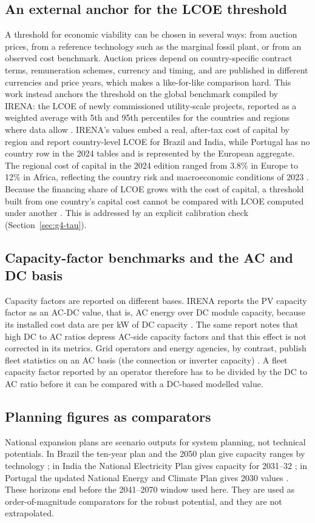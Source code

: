 \subsection{An external anchor for the LCOE threshold}
A threshold for economic viability can be chosen in several ways: from auction prices, from a reference technology such as the marginal fossil plant, or from an observed cost benchmark. Auction prices depend on country-specific contract terms, remuneration schemes, currency and timing, and are published in different currencies and price years, which makes a like-for-like comparison hard. This work instead anchors the threshold on the global benchmark compiled by IRENA: the LCOE of newly commissioned utility-scale projects, reported as a weighted average with 5th and 95th percentiles for the countries and regions where data allow \citep{irena2025costs24,irena2026costs25es}. IRENA's values embed a real, after-tax cost of capital by region and report country-level LCOE for Brazil and India, while Portugal has no country row in the 2024 tables and is represented by the European aggregate. The regional cost of capital in the 2024 edition ranged from 3.8\% in Europe to 12\% in Africa, reflecting the country risk and macroeconomic conditions of 2023 \citep{irena2025costs24}. Because the financing share of LCOE grows with the cost of capital, a threshold built from one country's capital cost cannot be compared with LCOE computed under another \citep{irena2025costs24}. This is addressed by an explicit calibration check (Section~\ref{sec:g4-tau}).

\subsection{Capacity-factor benchmarks and the AC and DC basis}
Capacity factors are reported on different bases. IRENA reports the PV capacity factor as an AC-DC value, that is, AC energy over DC module capacity, because its installed cost data are per kW of DC capacity \citep{irena2025costs24}. The same report notes that high DC to AC ratios depress AC-side capacity factors and that this effect is not corrected in its metrics. Grid operators and energy agencies, by contrast, publish fleet statistics on an AC basis (the connection or inverter capacity) \citep{epe2024nt011,ren2025dados,mnre2026stats}. A fleet capacity factor reported by an operator therefore has to be divided by the DC to AC ratio before it can be compared with a DC-based modelled value.

\subsection{Planning figures as comparators}
National expansion plans are scenario outputs for system planning, not technical potentials. In Brazil the ten-year plan and the 2050 plan give capacity ranges by technology \citep{epe2026pde,epe2020pne}; in India the National Electricity Plan gives capacity for 2031--32 \citep{cea2023nep}; in Portugal the updated National Energy and Climate Plan gives 2030 values \citep{pnec2025}. These horizons end before the 2041--2070 window used here. They are used as order-of-magnitude comparators for the robust potential, and they are not extrapolated.

